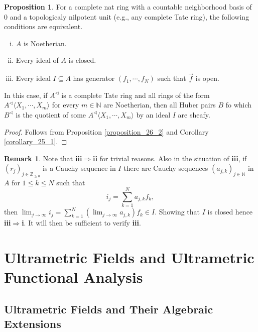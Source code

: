 \documentclass[10pt]{article}
\numberwithin{equation}{section}
\theoremstyle{definition}
\newtheorem{proposition}{Proposition}[subsection]
\newtheorem{remark}{Remark}[subsection]
\newcommand{\N}[0]{\mathbb{N}}
\newcommand{\Z}[0]{\mathbb{Z}}
\begin{document}
\begin{proposition}
    \label{remark_26_1}
    \label{proposition_remark_26_1}
    For a complete nat ring with a countable neighborhood basis of $0$ and a topologicaly nilpotent unit (e.g., any complete Tate ring), the following conditions are equivalent.
    \begin{enumerate}[i. ]
    \item $A$ is Noetherian.
    \item Every ideal of $A$ is closed.
    \item Every ideal $I\subseteq A$ has generator $(f_1,\cdots,f_N)$ such that $\vec{f}$ is open.
    \end{enumerate}
    In this case, if $A^\triangleleft$ is a complete Tate ring and all rings of the form $A^\triangleleft\langle X_1,\cdots,X_m\rangle$ for every $m\in\N$ are Noetherian, then all Huber pairs $B$ fo which $B^\triangleleft$ is the quotient of some $A^\triangleleft\langle X_1,\cdots,X_m\rangle$ by an ideal $I$ are sheafy.
\end{proposition}
\begin{proof}
    Follows from Proposition \ref{proposition_26_2} and Corollary \ref{corollary_25_1}.
\end{proof}

\begin{remark}
    Note that \textbf{iii}$\Rightarrow$\textbf{ii} for trivial reasons. Also in the situation of \textbf{iii}, if $(r_j)_{j\in\Z_{\geq0}}$ is a Cauchy sequence in $I$ there are Cauchy sequences $(a_{j,k})_{j\in \N}$ in $A$ for $1\leq k\leq N$ such that 
    \begin{equation*}
        i_j = \sum_{k=1}^N a_{j,k}f_k,
    \end{equation*}
    then $\lim_{j\to\infty}i_j = \sum_{k=1}^N\left(\lim_{j\to\infty}a_{j,k}\right)f_k\in I$. Showing that $I$ is closed hence \textbf{iii}$\Rightarrow$\textbf{i}. 
    It will then be sufficient to verify \textbf{iii}.
\end{remark}


\section{Ultrametric Fields and Ultrametric Functional Analysis}

\subsection{Ultrametric Fields and Their Algebraic Extensions}
\end{document}
